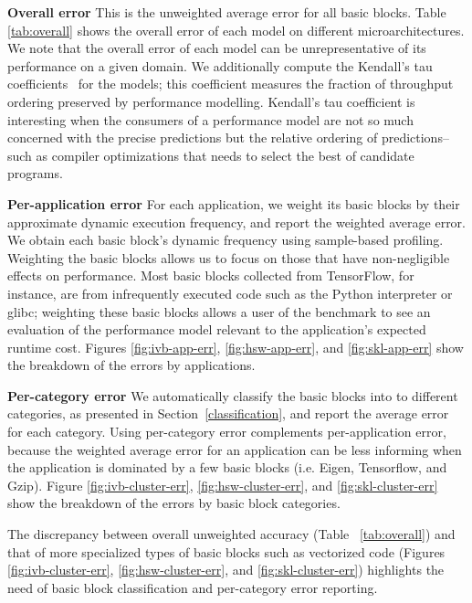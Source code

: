 \textbf{Overall error} This is the unweighted average error for all basic blocks.
Table \ref{tab:overall} shows the overall error of each model on different microarchitectures.
We note that the overall error of each model can be unrepresentative
of its performance on a given domain.
We additionally compute the Kendall's tau coefficients~\cite{kendalltau} for the models;
this coefficient measures the fraction of throughput ordering
preserved by performance modelling.
Kendall's tau coefficient is interesting when the consumers of a performance model
are not so much concerned with the precise predictions but
the relative ordering of predictions--such as compiler optimizations that needs 
to select the best of candidate programs.

\textbf{Per-application error}
For each application, we weight its basic blocks by their approximate
dynamic execution frequency,
and report the weighted average error.
We obtain each basic block's dynamic frequency using sample-based profiling.
Weighting the basic blocks allows us to focus on those that have
non-negligible effects on performance.
Most basic blocks collected from TensorFlow\cite{tensorflow},
for instance, are from infrequently executed code 
such as the Python interpreter or glibc;
weighting these basic blocks allows a user of the benchmark
to see an evaluation  of the performance model relevant
to the application's expected runtime cost.
Figures \ref{fig:ivb-app-err}, \ref{fig:hsw-app-err}, and \ref{fig:skl-app-err}
show the breakdown of the errors by applications.

\textbf{Per-category error} 
We automatically classify the basic blocks into
to different categories, as presented in Section~\ref{classification},
and report the average error for each category.
Using per-category error complements per-application error,
because the weighted average error for an application can be less informing 
when the application is dominated by a few basic blocks
(i.e. Eigen, Tensorflow, and Gzip).
Figure \ref{fig:ivb-cluster-err}, \ref{fig:hsw-cluster-err}, 
and \ref{fig:skl-cluster-err} show the breakdown of the errors by basic block categories.

The discrepancy between overall unweighted accuracy (Table ~\ref{tab:overall})
and that of more specialized types of basic blocks
such as vectorized code (Figures \ref{fig:ivb-cluster-err},
\ref{fig:hsw-cluster-err},
and \ref{fig:skl-cluster-err}) highlights
the need of basic block classification and per-category error reporting.

